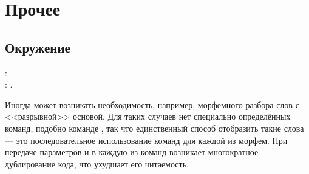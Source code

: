 \section{Прочее}

\subsection{Окружение }

\begin{tcolorbox}
    \noindent\rsTypeAux[env]: \\
    \hspace*{1cm} \rsOptionsAux: .
\end{tcolorbox}

Иногда может возникать необходимость, например, морфемного разбора слов с <<разрывной>> основой. Для таких случаев нет специально
определённых команд, подобно команде , так что единственный способ отобразить такие слова --- это
последовательное использование команд для каждой из морфем. При передаче параметров  и  в каждую из
команд возникает многократное дублирование кода, что ухудшает его читаемость.



